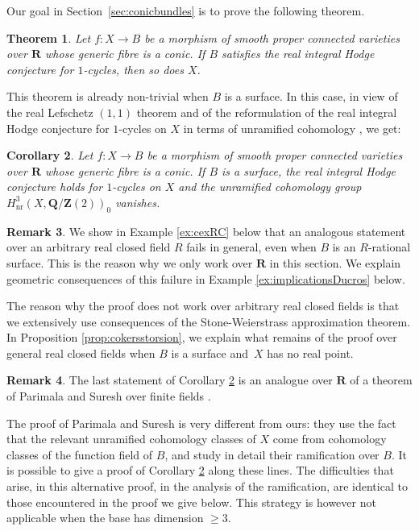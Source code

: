 \documentclass[JEP,XML,SOM,Unicode]{cedram}
\theoremstyle{plain}
\newtheorem{thm}{Theorem}[section]
\newtheorem{cor}[thm]{Corollary}
\theoremstyle{definition}
\newtheorem{rmk}[thm]{Remark}
\numberwithin{equation}{section}
\newcommand{\Q}{{\mathbf Q}}
\newcommand{\R}{{\mathbf R}}
\newcommand{\Z}{{\mathbf Z}}
\newcommand{\nr}{\mathrm{nr}}
\begin{document}
Our goal in Section~\ref{sec:conicbundles} is to prove the following theorem.

\begin{thm}
\label{thm:fibres en coniques}
Let $f:X\to B$ be a morphism of smooth proper connected varieties over $\R$ whose generic fibre is a conic. If $B$ satisfies the real integral Hodge conjecture for $1$-cycles, then so does $X$.
\end{thm}

This theorem is already non-trivial when $B$ is a surface.
In this case, in view of the real Lefschetz $(1,1)$ theorem \cite[Prop.\,\ref*{BW1-prop:real(1,1)}]{BW1} and of the reformulation of the real integral Hodge conjecture for $1$-cycles on $X$ in terms of unramified cohomology \cite[Rem.\,\ref*{BW1-rks:ch0 supported on surface}\,(iii)]{BW1}, we get:

\begin{cor}
\label{coro:solides fibres en coniques}
Let $f:X\to B$ be a morphism of smooth proper connected varieties over $\R$ whose generic fibre is a conic. If $B$ is a surface, the real integral Hodge conjecture holds for $1$-cycles on $X$ and the unramified cohomology group $H^3_{\nr}(X,\Q/\Z(2))_0$ vanishes.
\end{cor}

\begin{rmk}
We show in Example \ref{ex:cexRC} below that an analogous statement over an arbitrary real closed field $R$ fails in general, even when $B$ is an $R$-rational surface. This is the reason why we only work over $\R$ in this section.
We explain geometric consequences of this failure in Example \ref{ex:implicationsDucros} below.

The reason why the proof does not work over arbitrary real closed fields is that we extensively use consequences of the Stone-Weierstrass approximation theorem. In Proposition \ref{prop:cokersstorsion}, we explain what remains of the proof over general real closed fields when $B$ is a surface and~$X$ has no real point.
\end{rmk}

\begin{rmk}
The last statement of Corollary \ref{coro:solides fibres en coniques} is an analogue over $\R$ of a theorem of Parimala and Suresh over finite fields \cite[Th.\,1.3]{parimalasuresh}.

The proof of Parimala and Suresh is very different from ours: they use the fact that the relevant unramified cohomology classes of $X$ come from cohomology classes of the function field of $B$, and study in detail their ramification over $B$.
It is possible to give a proof of Corollary \ref{coro:solides fibres en coniques} along these lines.
The difficulties that arise, in this alternative proof, in the analysis of the ramification, are identical to those encountered in the proof we give below. This strategy is however not applicable when the base has dimension $\geq 3$.
\end{rmk}
\end{document}
